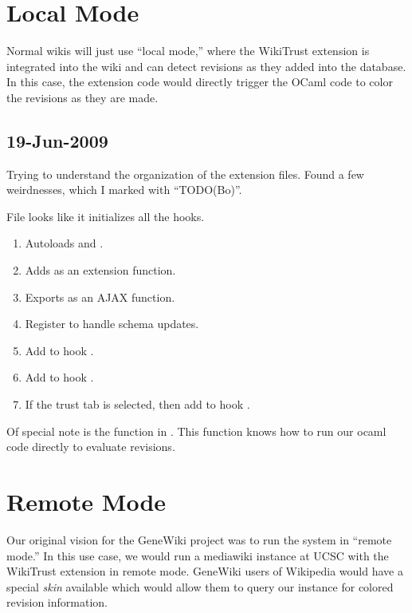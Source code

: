 \section{Local Mode}

Normal wikis will just use ``local mode,'' where the WikiTrust extension
is integrated into the wiki and can detect revisions as they added
into the database.
In this case, the extension code would directly trigger the
OCaml code to color the revisions as they are made.

\subsection{19-Jun-2009}

Trying to understand the organization of the extension files.  Found a few weirdnesses, which I marked with ``TODO(Bo)''.

File  looks like it initializes all the hooks.
\begin{enumerate}
\item Autoloads  and .
\item Adds  as an extension function.
\item Exports  as an AJAX function.
\item Register  to handle schema updates.
\item Add  to hook .
\item Add  to hook .
\item If the trust tab is selected, then add  to hook .
\end{enumerate}

Of special note is the function  in
.
This function knows how to run our ocaml code directly to evaluate revisions.


\section{Remote Mode}

Our original vision for the GeneWiki project was to run the
system in ``remote mode.''
In this use case, we would run a mediawiki instance at UCSC
with the WikiTrust extension in remote mode.
GeneWiki users of Wikipedia would have a special \textit{skin}
available which would allow them to query our instance for
colored revision information.

